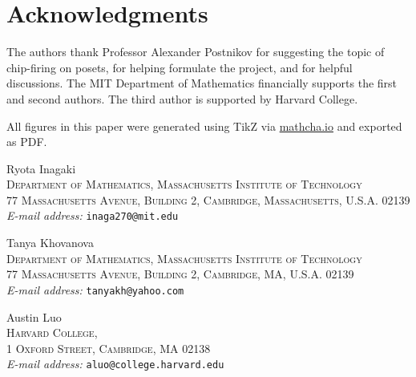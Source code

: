 \documentclass[11pt]{article}
\theoremstyle{definition}
\theoremstyle{remark}
\begin{document}
\section{Acknowledgments} 

The authors thank Professor Alexander Postnikov for suggesting the topic of chip-firing on posets, for helping formulate the project, and for helpful discussions. The MIT Department of Mathematics financially supports the first and second authors. The third author is supported by Harvard College.

All figures in this paper were generated using TikZ via \url{mathcha.io} and exported as PDF.



\smallskip

\noindent
Ryota Inagaki \\
\textsc{
Department of Mathematics, Massachusetts Institute of Technology\\
77 Massachusetts Avenue, Building 2, Cambridge, Massachusetts, U.S.A. 02139}\\
\textit{E-mail address: }\texttt{inaga270@mit.edu}
\medskip

\noindent
Tanya Khovanova \\
\textsc{
Department of Mathematics, Massachusetts Institute of Technology\\
77 Massachusetts Avenue, Building 2, Cambridge, MA, U.S.A. 02139}\\
\textit{E-mail address: }\texttt{tanyakh@yahoo.com}
\medskip

\noindent
Austin Luo \\
\textsc{
Harvard College,\\
1 Oxford Street,
Cambridge, MA 02138}\\
\textit{E-mail address: }\texttt{aluo@college.harvard.edu}
\medskip
\end{document}
